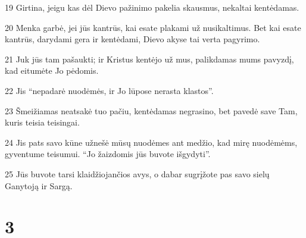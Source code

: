 \par 19 Girtina, jeigu kas dėl Dievo pažinimo pakelia skausmus, nekaltai kentėdamas. 
\par 20 Menka garbė, jei jūs kantrūs, kai esate plakami už nusikaltimus. Bet kai esate kantrūs, darydami gera ir kentėdami, Dievo akyse tai verta pagyrimo. 
\par 21 Juk jūs tam pašaukti; ir Kristus kentėjo už mus, palikdamas mums pavyzdį, kad eitumėte Jo pėdomis. 
\par 22 Jis “nepadarė nuodėmės, ir Jo lūpose nerasta klastos”. 
\par 23 Šmeižiamas neatsakė tuo pačiu, kentėdamas negrasino, bet pavedė save Tam, kuris teisia teisingai. 
\par 24 Jis pats savo kūne užnešė mūsų nuodėmes ant medžio, kad mirę nuodėmėms, gyventume teisumui. “Jo žaizdomis jūs buvote išgydyti”. 
\par 25 Jūs buvote tarsi klaidžiojančios avys, o dabar sugrįžote pas savo sielų Ganytoją ir Sargą.


\chapter{3}



